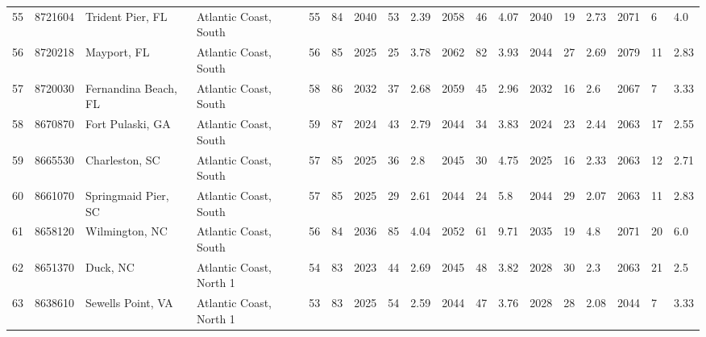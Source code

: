 \begin{longtable}{llllllllllllllllll}
55 &          8721604 &            Trident Pier, FL &    Atlantic Coast, South &              55 &       84 &                      2040 &   53 &   2.39 &     2058 &   46 &   4.07 &                          2040 &  19 &  2.73 &     2071 &    6 &   4.0 \\
56 &          8720218 &                 Mayport, FL &    Atlantic Coast, South &              56 &       85 &                      2025 &   25 &   3.78 &     2062 &   82 &   3.93 &                          2044 &  27 &  2.69 &     2079 &   11 &  2.83 \\
57 &          8720030 &        Fernandina Beach, FL &    Atlantic Coast, South &              58 &       86 &                      2032 &   37 &   2.68 &     2059 &   45 &   2.96 &                          2032 &  16 &   2.6 &     2067 &    7 &  3.33 \\
58 &          8670870 &            Fort Pulaski, GA &    Atlantic Coast, South &              59 &       87 &                      2024 &   43 &   2.79 &     2044 &   34 &   3.83 &                          2024 &  23 &  2.44 &     2063 &   17 &  2.55 \\
59 &          8665530 &              Charleston, SC &    Atlantic Coast, South &              57 &       85 &                      2025 &   36 &    2.8 &     2045 &   30 &   4.75 &                          2025 &  16 &  2.33 &     2063 &   12 &  2.71 \\
60 &          8661070 &         Springmaid Pier, SC &    Atlantic Coast, South &              57 &       85 &                      2025 &   29 &   2.61 &     2044 &   24 &    5.8 &                          2044 &  29 &  2.07 &     2063 &   11 &  2.83 \\
61 &          8658120 &              Wilmington, NC &    Atlantic Coast, South &              56 &       84 &                      2036 &   85 &   4.04 &     2052 &   61 &   9.71 &                          2035 &  19 &   4.8 &     2071 &   20 &   6.0 \\
62 &          8651370 &                    Duck, NC &  Atlantic Coast, North 1 &              54 &       83 &                      2023 &   44 &   2.69 &     2045 &   48 &   3.82 &                          2028 &  30 &   2.3 &     2063 &   21 &   2.5 \\
63 &          8638610 &           Sewells Point, VA &  Atlantic Coast, North 1 &              53 &       83 &                      2025 &   54 &   2.59 &     2044 &   47 &   3.76 &                          2028 &  28 &  2.08 &     2044 &    7 &  3.33 \\

\end{longtable}
